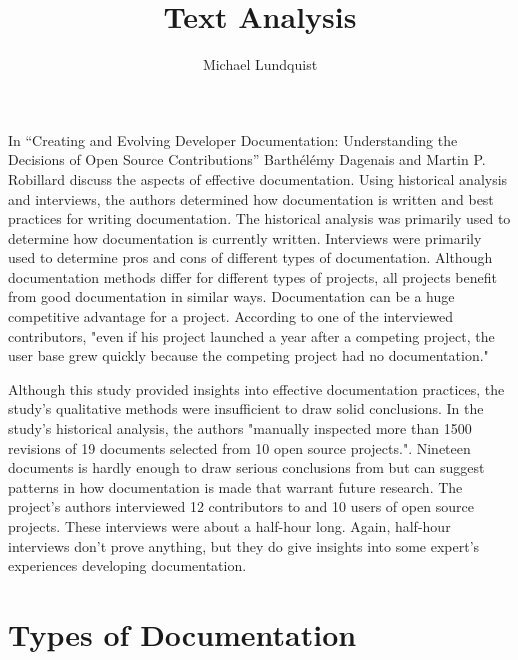 \documentclass[titlepage]{article}
\author{Michael Lundquist}
\title{Text Analysis}
\begin{document}
\maketitle


\setlength{\bibleftmargin}{.125in}
\doublespacing

In “Creating and Evolving Developer Documentation: Understanding the Decisions of Open Source Contributions” Barthélémy Dagenais and Martin P. Robillard discuss the aspects of effective documentation. Using historical analysis and interviews, the authors determined how documentation is written and best practices for writing documentation. The historical analysis was primarily used to determine how documentation is currently written. Interviews were primarily used to determine pros and cons of different types of documentation. Although documentation methods differ for different types of projects, all projects benefit from good documentation in similar ways. Documentation can be a huge competitive advantage for a project. According to one of the interviewed contributors, "even if his project launched a year after a competing project, the user base grew quickly because the competing project had no documentation." \cite[p.6]{Dagenais:2010:CED:1882291.1882312}

Although this study provided insights into effective documentation practices, the study's qualitative methods were insufficient to draw solid conclusions. In the study's historical analysis, the authors "manually inspected more than 1500 revisions of 19 documents selected from 10 open source projects."\cite[p.1]{Dagenais:2010:CED:1882291.1882312}. Nineteen documents is hardly enough to draw serious conclusions from but can suggest patterns in how documentation is made that warrant future research. The project's authors interviewed 12 contributors to and 10 users of open source projects. These interviews were about a half-hour long. Again, half-hour interviews don't prove anything, but they do give insights into some expert's experiences developing documentation.

\section{Types of Documentation}
\end{document}
